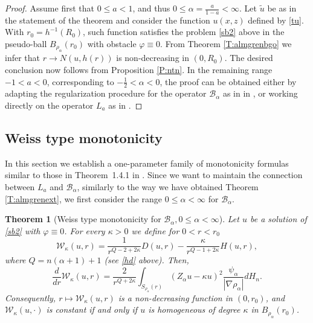 \documentclass[11pt]{amsart}
\theoremstyle{plain}
\newtheorem{thrm}{Theorem}[section]
\numberwithin{equation}{section}
\begin{document}
\begin{proof}
Assume first that $0\le a <1$, and thus $0 \le \alpha = \frac{a}{1-a}<\infty$. Let $\tilde u$ be as in the statement of the theorem and consider the function $u(x,z)$ defined by \eqref{tu}. With $r_0 = h^{-1}(R_0)$, such function satisfies the problem \eqref{sb2} above in the pseudo-ball $B_{\rho_\alpha}(r_0)$ with obstacle ${\varphi} \equiv 0$. From Theorem \ref{T:almgrenbgo} we infer that $r\to N(u,h(r))$ is non-decreasing in $(0,R_0)$. The desired conclusion now follows from Proposition \ref{P:ntn}. In the remaining range $-1<a<0$, corresponding to $-\frac 12<\alpha<0$, the proof can be obtained either by adapting the regularization procedure for the operator ${\mathcal{B}_\alpha}$ as in in \cite{G}, or working directly on the operator $L_a$ as in \cite{CS}.

\end{proof}

\subsection{Weiss type monotonicity}\label{SS:weiss}
In this section we  establish a one-parameter family of monotonicity formulas similar to those in Theorem~1.4.1 in \cite{GP}. Since we want to maintain the connection between $L_a$ and ${\mathcal{B}_\alpha}$, similarly to the way we have obtained Theorem \ref{T:almgrenext}, we first consider the range $0\le \alpha<\infty$ for ${\mathcal{B}_\alpha}$.

\begin{thrm}[Weiss type monotonicity for ${\mathcal{B}_\alpha}, 0\le \alpha <\infty$]\label{T:weissB}
 Let $u$ be a solution of \eqref{sb2} with ${\varphi}\equiv 0$. For every $\kappa> 0$ we define for $0<r<r_0$
 \begin{equation}\label{WBa}
  \mathcal{W}_\kappa(u,r)=\frac{1}{r^{Q-2+2\kappa}}D(u,r)-\frac{\kappa}{r^{Q-1+2\kappa}}H(u,r),
 \end{equation}
 where $Q = n(\alpha +1) + 1$ (see \eqref{hd} above). Then,
 \begin{equation}\label{W'Ba}
  \frac{d}{dr}\mathcal{W}_\kappa(u,r)=\frac{2}{r^{Q+2\kappa}}\int_{{S_{\rho_\alpha}(r)}}(Z_\alpha u-\kappa u)^2\frac{\psi_\alpha}{|\nabla {\rho_\alpha}|}dH_{n}.
 \end{equation}
 Consequently, $r\mapsto \mathcal{W}_\kappa(u,r)$ is a non-decreasing function in $(0,r_0)$, and $\mathcal{W}_\kappa(u,\cdot)$ is constant if and only if $u$ is homogeneous of degree $\kappa$ in $B_{\rho_\alpha}(r_0)$.
\end{thrm}
\end{document}
